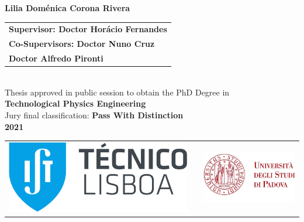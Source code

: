 {\vspace{2cm}
{\FontNam \textbf{Lilia Dom\'enica Corona Rivera}} \\
\vspace{2cm}
{\FontS %
\begin{tabular}{l}
	\FontL
\textbf{Supervisor: Doctor Hor\'acio Fernandes} \\
	\FontL\textbf{Co-Supervisors: Doctor Nuno Cruz}\\
	\FontL\textbf{\hspace{4.05cm} Doctor Alfredo Pironti}\\
\end{tabular} } \\
\vspace{1.8cm}
{\FontM Thesis approved in public session to obtain the PhD Degree in} \\
\vspace{1.8mm}
{\FontL \textbf{Technological Physics Engineering}} \\
\vspace{1.8cm}
{\FontL Jury final classification: \textbf{Pass With Distinction}}\\
\vspace{1.8cm}
{\FontM \textbf{2021}} \\


\newpage
\thispagestyle{empty}




\begin{tabular}{>{\raggedleft}m{5cm}>{\centering}m{\dimexpr\textwidth - 10cm\relax}>{\raggedright}m{5cm}}
	\includegraphics[width=\linewidth]{includes/LogoIST.pdf}%
	&
	&%
	\includegraphics[width=\linewidth]{includes/LogoPadova.jpg} %
\end{tabular}

}
